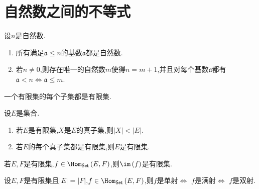 \section{自然数之间的不等式}

\begin{proposition}{}{}
	设$n$是自然数.
	\begin{enumerate}
		\item 所有满足$\mathfrak{a}\leq n$的基数$\mathfrak{a}$都是自然数.
		\item 若$n\neq 0$,则存在唯一的自然数$m$使得$n=m+1$,并且对每个基数$\mathfrak{a}$都有$\mathfrak{a}<n\iff\mathfrak{a}\leq m$.
	\end{enumerate}
\end{proposition}

\begin{corollary}{}{}
	一个有限集的每个子集都是有限集.
\end{corollary}

\begin{corollary}{}{}
	设$E$是集合.
	\begin{enumerate}
		\item 若$E$是有限集,$X$是$E$的真子集,则$\left|X\right|<\left|E\right|$.
		\item 若$E$的每个真子集都是有限集,则$E$是有限集.
	\end{enumerate}
\end{corollary}

\begin{corollary}{}{}
	若$E,F$是有限集,$f\in\Hom_{\mathsf{Set}}\left(E,F\right)$,则$\im\left(f\right)$是有限集.
\end{corollary}

\begin{corollary}{}{}
	设$E,F$是有限集且$\left|E\right|=\left|F\right|$,$f\in\Hom_{\mathsf{Set}}\left(E,F\right)$,则$f$是单射$\iff$ $f$是满射$\iff$ $f$是双射.
\end{corollary}

















